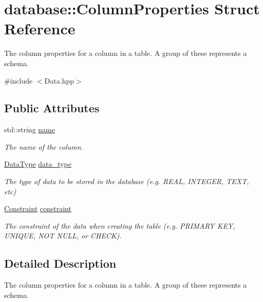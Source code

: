 \hypertarget{structdatabase_1_1_column_properties}{}\section{database\+:\+:Column\+Properties Struct Reference}
\label{structdatabase_1_1_column_properties}


The column properties for a column in a table. A group of these represents a schema.  




{\ttfamily \#include $<$Data.\+hpp$>$}

\subsection*{Public Attributes}
\begin{DoxyCompactItemize}
\item 
std\+::string \hyperlink{structdatabase_1_1_column_properties_a69a1e887784799661e9345b0f4d88256}{name}
\begin{DoxyCompactList}\small\item\em The name of the column. \end{DoxyCompactList}\item 
\hyperlink{namespacedatabase_a596cea80c57ec5a9b3b4018f733a43fd}{Data\+Type} \hyperlink{structdatabase_1_1_column_properties_a34af986257f79a7b2c9ad2e01013f99e}{data\+\_\+type}
\begin{DoxyCompactList}\small\item\em The type of data to be stored in the database (e.\+g. R\+E\+AL, I\+N\+T\+E\+G\+ER, T\+E\+XT, etc) \end{DoxyCompactList}\item 
\hyperlink{namespacedatabase_a77defe1118948f64f1e32f4b78c04f5b}{Constraint} \hyperlink{structdatabase_1_1_column_properties_a587d4ebc4c0e8ebfa48e336a08f234f5}{constraint}
\begin{DoxyCompactList}\small\item\em The constraint of the data when creating the table (e.\+g. P\+R\+I\+M\+A\+RY K\+EY, U\+N\+I\+Q\+UE, N\+OT N\+U\+LL, or C\+H\+E\+CK). \end{DoxyCompactList}\end{DoxyCompactItemize}


\subsection{Detailed Description}
The column properties for a column in a table. A group of these represents a schema. 

